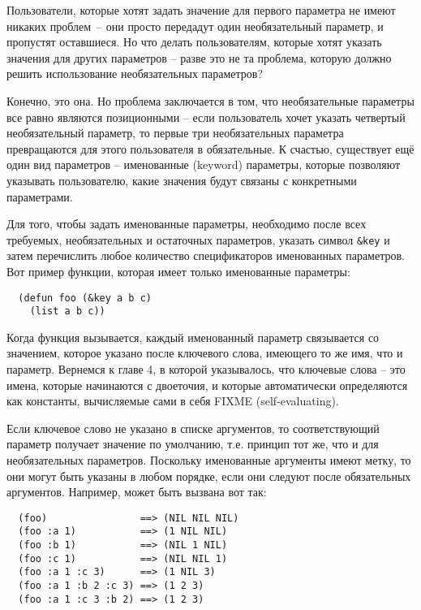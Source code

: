 Пользователи, которые хотят задать значение для первого параметра не имеют никаких
проблем~-- они просто передадут один необязательный параметр, и пропустят оставшиеся.  Но
что делать пользователям, которые хотят указать значения для других параметров -- разве
это не та проблема, которую должно решить использование необязательных параметров?

Конечно, это она.  Но проблема заключается в том, что необязательные параметры все равно
являются позиционными -- если пользователь хочет указать четвертый необязательный
параметр, то первые три необязательных параметра превращаются для этого пользователя в
обязательные.  К счастью, существует ещё один вид параметров -- именованные (keyword)
параметры, которые позволяют указывать пользователю, какие значения будут связаны с
конкретными параметрами.

Для того, чтобы задать именованные параметры, необходимо после всех требуемых,
необязательных и остаточных параметров, указать символ \lstinline!&key! и затем
перечислить любое количество спецификаторов именованных параметров.  Вот пример функции,
которая имеет только именованные параметры:

\begin{lstlisting}
  (defun foo (&key a b c) 
    (list a b c))
\end{lstlisting}

Когда функция вызывается, каждый именованный параметр связывается со значением, которое
указано после ключевого слова, имеющего то же имя, что и параметр.  Вернемся к главе 4, в
которой указывалось, что ключевые слова -- это имена, которые начинаются с двоеточия, и
которые автоматически определяются как константы, вычисляемые сами в себя FIXME
(self-evaluating).

Если ключевое слово не указано в списке аргументов, то соответствующий параметр получает
значение по умолчанию, т.е. принцип тот же, что и для необязательных параметров.
Поскольку именованные аргументы имеют метку, то они могут быть указаны в любом порядке,
если они следуют после обязательных аргументов.  Например,  может быть вызвана
вот так:

\begin{verbatim}
  (foo)                ==> (NIL NIL NIL)
  (foo :a 1)           ==> (1 NIL NIL)
  (foo :b 1)           ==> (NIL 1 NIL)
  (foo :c 1)           ==> (NIL NIL 1)
  (foo :a 1 :c 3)      ==> (1 NIL 3)
  (foo :a 1 :b 2 :c 3) ==> (1 2 3)
  (foo :a 1 :c 3 :b 2) ==> (1 2 3)
\end{verbatim}

